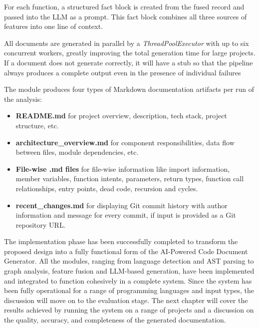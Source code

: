 \par For each function, a structured fact block is created from the fused record and passed into the LLM as a prompt. This fact block combines all three sources of features into one line of context.


\par All documents are generated in parallel by a \textit{ThreadPoolExecutor} with up to six concurrent workers, greatly improving the total generation time for large projects. If a document does not generate correctly, it will have a stub so that the pipeline always produces a complete output even in the presence of individual failures


\par The module produces four types of Markdown documentation artifacts per run of the analysis:
\begin{itemize}
\item \textbf{README.md} for project overview, description, tech stack, project structure, etc.
\item \textbf{architecture\_overview.md} for component responsibilities, data flow between files, module dependencies, etc.
\item \textbf{File-wise .md files} for file-wise information like import information, member variables, function intents, parameters, return types, function call relationships, entry points, dead code, recursion and cycles.
\item \textbf{recent\_changes.md} for displaying Git commit history with author information and message for every commit, if input is provided as a Git repository URL.
\end{itemize}

\par The implementation phase has been successfully completed to transform the proposed design into a fully functional form of the AI-Powered Code Document Generator. All the modules, ranging from language detection and AST parsing to graph analysis, feature fusion and LLM-based generation, have been implemented and integrated to function cohesively in a complete system. Since the system has been fully operational for a range of programming languages and input types, the discussion will move on to the evaluation stage. The next chapter will cover the results achieved by running the system on a range of projects and a discussion on the quality, accuracy, and completeness of the generated documentation.


